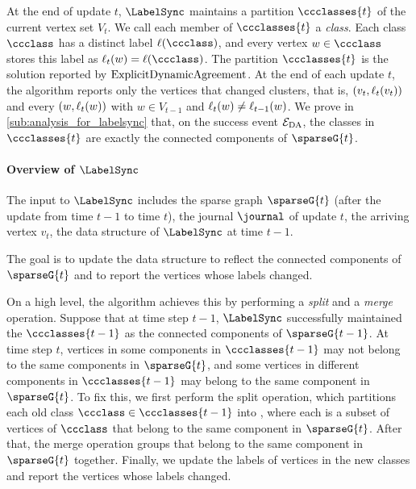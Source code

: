 At the end of update $ t $, $ \LabelSync $ maintains a partition $ \ccclasses{t} $ of the current vertex set $ V_t $.
We call each member of $ \ccclasses{t} $ a \emph{class}.
Each class $ \ccclass $ has a distinct label $ \complabel(\ccclass) $, and every vertex $ w\in\ccclass $ stores this label as $ \complabel_t(w)=\complabel(\ccclass) $.
The partition $ \ccclasses{t} $ is the solution reported by $ \mathrm{ExplicitDynamicAgreement} $.
At the end of each update $ t $, the algorithm reports only the vertices that changed clusters, that is, $ (v_t,\ell_t(v_t)) $ and every $ (w,\ell_t(w)) $ with $ w\in V_{t-1} $ and $ \ell_t(w)\ne\ell_{t-1}(w) $.
We prove in \cref{sub:analysis_for_labelsync} that, on the success event $ \mathcal{E}_{\rm DA} $, the classes in $ \ccclasses{t} $ are exactly the connected components of $ \sparseG{t} $.

\paragraph{Overview of \texorpdfstring{$ \LabelSync $}{LabelSync}}\label{par:overview.of.LabelSync} %
The input to $ \LabelSync $ includes the sparse graph $ \sparseG{t} $ (after the update from time $ t-1 $ to time $ t $), the journal $ \journal $ of update $ t $, the arriving vertex $ v_t $, the data structure of $ \LabelSync $ at time $ t-1 $.

The goal is to update the data structure to reflect the connected components of $ \sparseG{t} $ and to report the vertices whose labels changed.

On a high level, the algorithm achieves this by performing a \emph{split} and a \emph{merge} operation.
Suppose that at time step $ t-1 $, $ \LabelSync $ successfully maintained the $ \ccclasses{t-1} $ as the connected components of $ \sparseG{t-1} $.
At time step $ t $, vertices in some components in $ \ccclasses{t-1} $ may not belong to the same components in $ \sparseG{t} $, and some vertices in different components in $ \ccclasses{t-1} $ may belong to the same component in $ \sparseG{t} $.
To fix this, we first perform the split operation, which partitions each old class $ \ccclass \in \ccclasses{t-1} $ into , where each \piece{} is a subset of vertices of $ \ccclass $ that belong to the same component in $ \sparseG{t} $.
After that, the merge operation groups  that belong to the same component in $ \sparseG{t} $ together.
Finally, we update the labels of vertices in the new classes and report the vertices whose labels changed.

